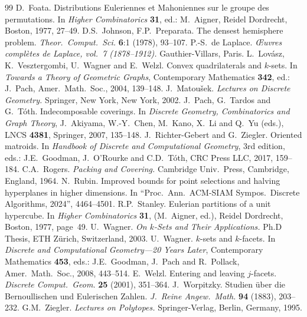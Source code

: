 \documentclass[a4paper,UKenglish,cleveref, autoref,numberwithinsect]{socg-lipics-v2021}
\theoremstyle{plain}
\begin{document}
\begin{thebibliography}{99}
{\sc D.\ Foata.}
Distributions Euleriennes et Mahoniennes sur le groupe des permutations.
In \emph{Higher Combinatorics} {\bf 31}, ed.: M.\ Aigner, Reidel Dordrecht, Boston, 1977, 27--49.
{\sc D.S.\ Johnson, F.P.\ Preparata.}
The densest hemisphere problem. \emph{Theor.\ Comput.\ Sci.} {\bf 6}:1 (1978), 93--107.
{\sc P.-S.\ de Laplace.} 
\emph{{\OE}uvres compl\`etes de Laplace, vol.\ 7 (1878--1912).} Gauthier-Villars, Paris.
{\sc L.\ Lov\'asz, K.\ Vesztergombi, U.\ Wagner and E.\ Welzl.} Convex quadrilaterals and $k$-sets.
In \emph{Towards a Theory of Geometric Graphs}, Contemporary Mathematics {\bf 342}, ed.: J.\ Pach, Amer.\ Math.\ Soc., 2004,  139--148.
{\sc J.\ Matou\v{s}ek.}
\emph{Lectures on Discrete Geometry.}
Springer, New York, New York, 2002.
{\sc J.\ Pach, G.\ Tardos and G.\ T\'{o}th.}
Indecomposable coverings.
In \emph{Discrete Geometry, Combinatorics and Graph Theory}, J.\ Akiyama, W.-Y.\ Chen, M.\ Kano, X.\ Li and Q.\ Yu (eds.), LNCS {\bf 4381}, Springer, 2007, 135--148.
{\sc J.\ Richter-Gebert and G.\ Ziegler.}
Oriented matroids.
In \emph{Handbook of Discrete and Computational Geometry}, 3rd edition, eds.: J.E.\ Goodman, J.\ O'Rourke and C.D.\ T\'oth, CRC Press LLC, 2017, 159--184.
{\sc C.A.\ Rogers.}
\emph{Packing and Covering.}
Cambridge Univ.\ Press, Cambridge, England, 1964.
{\sc N.\ Rubin.}
Improved bounds for point selections and halving hyperplanes in higher dimensions.
In ``Proc.\ Ann.\ ACM-SIAM Sympos.\ Discrete Algorithms, 2024'', 4464--4501.
{\sc R.P.\ Stanley.}
Eulerian partitions of a unit hypercube.
In \emph{Higher Combinatorics} {\bf 31}, (M.\ Aigner, ed.), Reidel Dordrecht, Boston, 1977, page~49.
{\sc U.\ Wagner.}
\emph{On $k$-Sets and Their Applications.}
Ph.D Thesis, ETH Z\"urich, Switzerland, 2003.   
{\sc U.\ Wagner.}
$k$-sets and $k$-facets.
In \emph{Discrete and Computational Geometry---20 Years Later}, Contemporary Mathematics {\bf 453}, eds.: J.E.\ Goodman, J.\ Pach and R.\ Pollack, Amer.\ Math.\ Soc., 2008, 443--514.
{\sc E.\ Welzl.}
Entering and leaving $j$-facets.
\emph{Discrete Comput.\ Geom.} {\bf 25} (2001), 351--364.
{\sc J.\ Worpitzky.}
Studien über die Bernoullischen und Eulerischen Zahlen.
\emph{J.\ Reine Angew.\ Math.} {\bf 94} (1883), 203--232.
{\sc G.M.\ Ziegler.}
\emph{Lectures on Polytopes.}
Springer-Verlag, Berlin, Germany, 1995.
\end{thebibliography}
\end{document}
